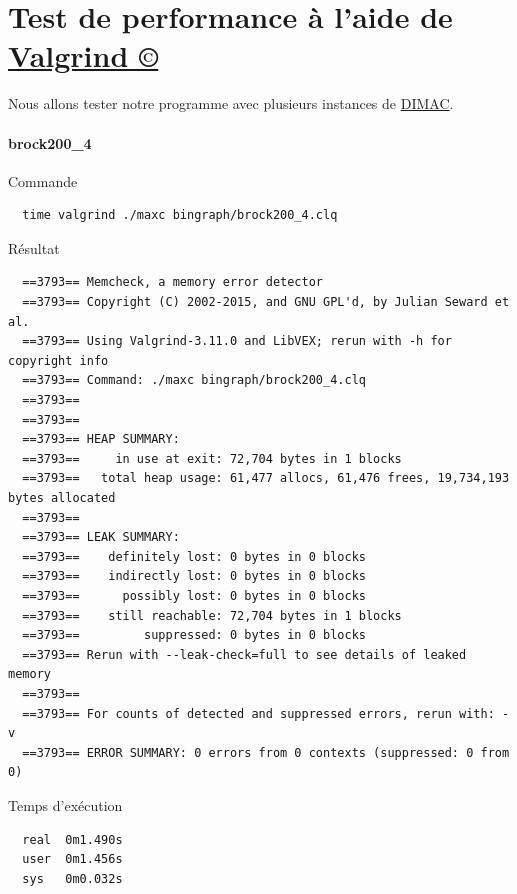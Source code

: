 \documentclass{article}
\begin{document}
\section{Test de performance à l'aide de \href{http://www.valgrind.org/}{Valgrind ©}}
Nous allons tester notre programme avec plusieurs instances de \href{https://turing.cs.hbg.psu.edu/txn131/clique.html}{DIMAC}.\\
\paragraph{brock200\_4}
Commande
\begin{verbatim}
  time valgrind ./maxc bingraph/brock200_4.clq
\end{verbatim}
Résultat
\begin{verbatim}
  ==3793== Memcheck, a memory error detector
  ==3793== Copyright (C) 2002-2015, and GNU GPL'd, by Julian Seward et al.
  ==3793== Using Valgrind-3.11.0 and LibVEX; rerun with -h for copyright info
  ==3793== Command: ./maxc bingraph/brock200_4.clq
  ==3793==
  ==3793==
  ==3793== HEAP SUMMARY:
  ==3793==     in use at exit: 72,704 bytes in 1 blocks
  ==3793==   total heap usage: 61,477 allocs, 61,476 frees, 19,734,193 bytes allocated
  ==3793==
  ==3793== LEAK SUMMARY:
  ==3793==    definitely lost: 0 bytes in 0 blocks
  ==3793==    indirectly lost: 0 bytes in 0 blocks
  ==3793==      possibly lost: 0 bytes in 0 blocks
  ==3793==    still reachable: 72,704 bytes in 1 blocks
  ==3793==         suppressed: 0 bytes in 0 blocks
  ==3793== Rerun with --leak-check=full to see details of leaked memory
  ==3793==
  ==3793== For counts of detected and suppressed errors, rerun with: -v
  ==3793== ERROR SUMMARY: 0 errors from 0 contexts (suppressed: 0 from 0)

\end{verbatim}
Temps d'exécution
\begin{verbatim}
  real  0m1.490s
  user  0m1.456s
  sys   0m0.032s
\end{verbatim}
\end{document}
